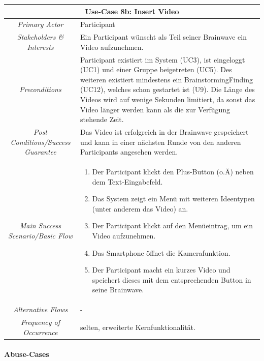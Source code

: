 \renewcommand{\arraystretch}{1.35}
\begin{center}
	\begin{longtable}{| c | p{7cm} |}
		\hline
		\multicolumn{2}{|c|}{\textbf{Use-Case 8b: Insert Video}}\\
		\hline\hline
		\textit{Primary Actor} & Participant\\
		\hline
		\textit{Stakeholders \& Interests} & Ein Participant wünscht als Teil seiner Brainwave ein Video aufzunehmen. \\
		\hline
		\textit{Preconditions} & Participant existiert im System (UC3), ist eingeloggt (UC1) und einer Gruppe beigetreten (UC5). Des weiteren existiert mindestens ein BrainstormingFinding (UC12), welches schon gestartet ist (U9). Die Länge des Videos wird auf wenige Sekunden limitiert, da sonst das Video länger werden kann als die zur Verfügung stehende Zeit.\\
		\hline
		\textit{Post Conditions/Success Guarantee} & Das Video ist erfolgreich in der Brainwave gespeichert und kann in einer nächsten Runde von den anderen Participants angesehen werden.\\
		\hline
		\textit{Main Success Scenario/Basic Flow} & 
		\begin{enumerate}[noitemsep]
			\item Der Participant klickt den Plus-Button (o.Ä) neben dem Text-Eingabefeld.
			\item Das System zeigt ein Menü mit weiteren Ideentypen (unter anderem das Video) an.
			\item Der Participant klickt auf den Menüeintrag, um ein Video aufzunehmen.
			\item Das Smartphone öffnet die Kamerafunktion.
			\item Der Participant macht ein kurzes Video und speichert dieses mit dem entsprechenden Button in seine Brainwave.
		\end{enumerate}\\
		\hline
		\textit{Alternative Flows} &
		-\\
		\hline
		\textit{Frequency of Occurrence} & selten, erweiterte Kernfunktionalität.\\
		\hline
	\end{longtable}
\end{center}



\paragraph{Abuse-Cases}~\\

